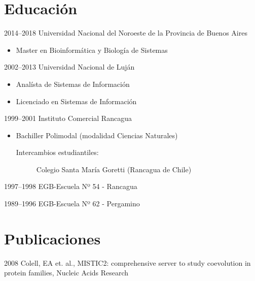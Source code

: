 \documentclass[a4paper]{article}
\begin{document}
\section{Educaci{\'o}n}
\begin{CV}
\item[2014--2018] Universidad Nacional del Noroeste de la Provincia de Buenos Aires
  \begin{itemize}
  \item Master en Bioinform{\'a}tica y Biolog{\'i}a de Sistemas
  \end{itemize}
\item[2002--2013] Universidad Nacional de Luj{\'a}n
  \begin{itemize}
  \item Anal{\'i}sta de Sistemas de Informaci{\'o}n
  \item Licenciado en Sistemas de Informaci{\'o}n
  \end{itemize}
\item[1999--2001] Instituto Comercial Rancagua
  \begin{itemize}
  \item Bachiller Polimodal (modalidad Ciencias Naturales)
  	\begin{description}
  	\item[Intercambios estudiantiles: ] Colegio Santa Mar{\'i}a Goretti (Rancagua de Chile)
  	\end{description}
  \end{itemize}
\item[1997--1998] EGB-Escuela Nº 54 - Rancagua
\item[1989--1996] EGB-Escuela Nº 62 - Pergamino
\end{CV}

\section{Publicaciones}
\begin{CV}
\item[2008] Colell, EA et. al., MISTIC2: comprehensive server to study coevolution in protein families, Nucleic Acids Research
\end{CV}
\end{document}
